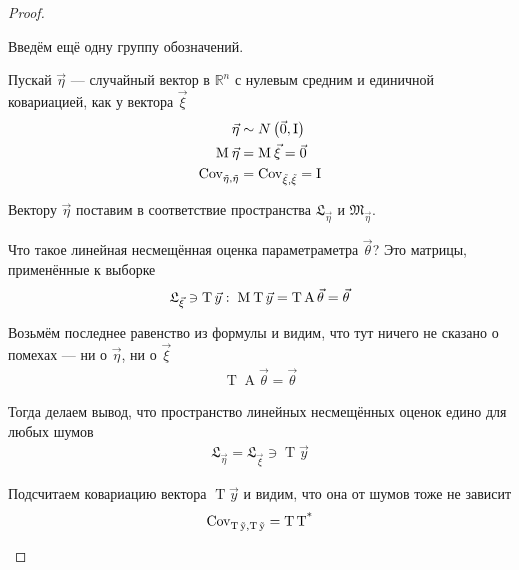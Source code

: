 \begin{proof}
\begin{enumerate}
            Введём ещё одну группу обозначений.

            Пускай $\vec{\eta}$ --- случайный вектор в $\mathbb{R}^n$ с нулевым
            средним и единичной ковариацией, как у вектора $\vec{\xi}$
            \begin{align*}
                \vec{\eta} &\sim N\left( \vec{0}, \operatorname{I} \right) \\
                \operatorname{M}_{} \vec{\eta} &= \operatorname{M}_{} \vec{\xi} = \vec{0} \\
                \operatorname{Cov^{}_{\vec{\eta}, \vec{\eta}}} &= \operatorname{Cov^{}_{\vec{\xi}, \vec{\xi}}} = \operatorname{I}
            \end{align*}

            Вектору $\vec{\eta}$ поставим в соответствие пространства
            $\mathfrak{L}_{\vec{\eta}}$ и $\mathfrak{M}_{\vec{\eta}}$.

            Что такое линейная несмещённая оценка параметраметра $\vec{\theta}$?
            Это матрицы, применённые к выборке
            \begin{align*}
                \mathfrak{L}_{\vec{\xi}} \ni \operatorname{T} \vec{y}:\;
                \operatorname{M}_{} \operatorname{T} \vec{y}
                = \operatorname{T} \operatorname{A} \vec{\theta}
                = \vec{\theta}
            \end{align*}

            Возьмём последнее равенство из формулы и видим, что тут ничего не
            сказано о помехах --- ни о $\vec{\eta}$, ни о $\vec{\xi}$
            \begin{align*}
                \operatorname{T} \operatorname{A} \vec{\theta}
                = \vec{\theta}
            \end{align*}

            Тогда делаем вывод, что пространство линейных несмещённых оценок
            едино для любых шумов
            \begin{align*}
                \mathfrak{L}_{\vec{\eta}}
                = \mathfrak{L}_{\vec{\xi}}
                \ni \operatorname{T} \vec{y}
            \end{align*}

            Подсчитаем ковариацию вектора $\operatorname{T} \vec{y}$ и видим,
            что она от шумов тоже не зависит
            \begin{align*}
                \operatorname{Cov^{}_{\operatorname{T} \vec{y}, \operatorname{T} \vec{y}}}
                = \operatorname{T} \operatorname{T^*}
            \end{align*}


\end{enumerate}
\end{proof}
